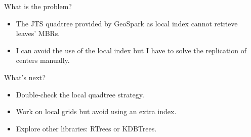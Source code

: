 \documentclass{beamer}
\begin{document}
\begin{frame}{What is the problem?}
    \begin{itemize}
        \item The JTS quadtree provided by GeoSpark as local index cannot retrieve leaves' MBRs.
        \item I can avoid the use of the local index but I have to solve the replication of centers manually.
    \end{itemize}
\end{frame}

\begin{frame}{What's next?}
    \begin{itemize}
        \item Double-check the local quadtree strategy.
        \item Work on local grids but avoid using an extra index.
        \item Explore other libraries: RTrees or KDBTrees.
    \end{itemize}
\end{frame}
\end{document}
